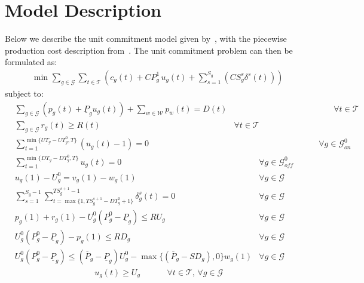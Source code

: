 \documentclass{article}
\newcommand{\cT}{{\mathcal T}}
\newcommand{\cG}{{\mathcal G}}
\newcommand{\cW}{{\mathcal W}}
\newcommand{\uP}{\underline{P}}
\newcommand{\oP}{\overline{P}}
\begin{document}
\section{Model Description}
Below we describe the unit commitment model given by~\cite{morales2013tight}, with the piecewise production cost description from~\cite{sridhar2013locally}.
The unit commitment problem can then be formulated as:
{\allowdisplaybreaks
		\begin{align}
		& \text{min } \sum_{g \in \cG} \sum_{t \in \cT} \left( c_g(t) + CP_g^1 \, u_g(t) + \sum_{s = 1}^{S_g} \left( CS^s_g \delta^s(t) \right) \right) \label{eq:obj} %
		\end{align}
		subject to:
		\begin{align}
		& \sum_{g \in \cG} \left( p_g(t) + \uP_g u_g(t) \right) + \sum_{w\in\cW} p_w(t) = D(t) & \hspace{5cm} \forall t \in \cT \label{eq:UCDemand} \\
		& \sum_{g \in \cG} r_g(t) \geq R(t) &  \forall t \in \cT \label{eq:UCReserves}
		\end{align}
		\begin{align}
		& \sum_{t=1}^{\min\{UT_g - UT_g^0, T\}} (u_g(t) - 1) = 0 & \hspace{3cm} \forall g \in \cG_{\textit{on}}^0 \label{eq:initialUpRequirement} \\
		& \sum_{t=1}^{\min\{DT_g - DT_g^0, T\}} u_g(t) = 0 & \forall g \in \cG_{\textit{off}}^0 \label{eq:initialDownRequirement} \\
		& u_g(1) - U_g^0 = v_g(1) - w_g(1) & \forall g \in \cG \label{eq:LogicalInitial} \\	
		& \sum_{s=1}^{S_g-1} \sum_{t=\max\{1, TS^{s+1}_g - DT^0_g + 1\}}^{TS^{s+1}_g -1} \delta^s_g(t) = 0 & \forall g \in \cG \label{eq:STIInit}\\
		& p_g(1) + r_g(1) - U_g^0(P_g^0-\uP_g) \leq RU_g & \forall g \in \cG \label{eq:RampUpInit} \\
		& U_g^0(P_g^0-\uP_g) - p_g(1) \leq RD_g & \forall g \in \cG \label{eq:RampDownInit} \\
		& U_g^0(P_g^0-\uP_g) \leq (\oP_g - \uP_g) U_g^0 - \max\{(\oP_g - SD_g),0\} w_g(1) & \forall g \in \cG \label{eq:MaxOutput2Init}
		\end{align}
		\begin{align}
		& u_g(t) \geq U_g & \hspace{1cm} \forall t \in \cT, \, \forall g \in \cG \label{eq:MustRun} \\

\end{align}}
\end{document}
